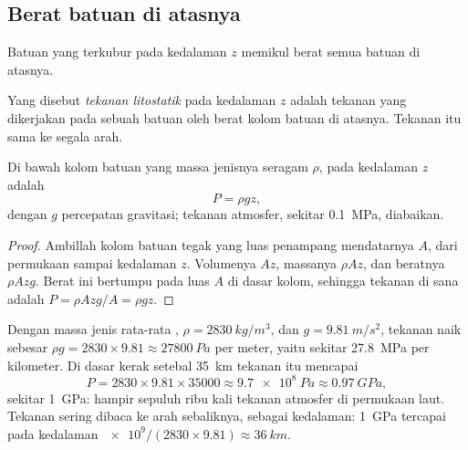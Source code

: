 \subsection{Berat batuan di atasnya}

Batuan yang terkubur pada kedalaman $z$ memikul berat semua batuan di atasnya.

\begin{definition}\label{def:g12:metamorphic-rocks:lithostatic}
Yang disebut \emph{tekanan litostatik} pada kedalaman
$z$ adalah tekanan yang dikerjakan pada sebuah batuan oleh berat kolom batuan
di atasnya. Tekanan itu sama ke segala arah.
\end{definition}

\begin{proposition}\label{prop:g12:metamorphic-rocks:lithostatic}
Di bawah kolom batuan yang massa jenisnya seragam $\rho$, 
pada kedalaman $z$ adalah
\[
  P = \rho g z ,
\]
dengan $g$ percepatan gravitasi; tekanan atmosfer, sekitar \qty{0.1}{MPa},
diabaikan.
\end{proposition}

\begin{proof}
Ambillah kolom batuan tegak yang luas penampang mendatarnya $A$, dari
permukaan sampai kedalaman $z$. Volumenya $Az$, massanya $\rho A z$, dan
beratnya $\rho A z g$. Berat ini bertumpu pada luas $A$ di dasar kolom,
sehingga tekanan di sana adalah $P = \rho A z g / A = \rho g z$.
\end{proof}

Dengan massa jenis rata-rata , $\rho = \qty{2830}{kg/m^3}$,
dan $g = \qty{9.81}{m/s^2}$, tekanan naik sebesar $\rho g = 2830 \times 9.81
\approx \qty{27800}{Pa}$ per meter, yaitu sekitar \qty{27.8}{MPa} per
kilometer. Di dasar kerak setebal \qty{35}{km} tekanan itu mencapai
\[
  P = 2830 \times 9.81 \times \num{35000} \approx \qty{9.7e8}{Pa} \approx
  \qty{0.97}{GPa},
\]
sekitar \qty{1}{GPa}: hampir sepuluh ribu kali tekanan atmosfer di permukaan
laut. Tekanan sering dibaca ke arah sebaliknya, sebagai kedalaman:
\qty{1}{GPa} tercapai pada kedalaman $\num{e9}/(2830 \times 9.81) \approx \qty{36}{km}$.

